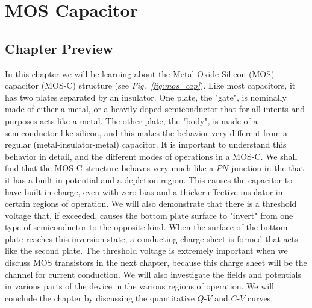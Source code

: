 \chapter{MOS Capacitor}
\label{ch:ch07_mos_c}
\graphicspath{{./figures/figs_ch07_MOS_C/}}
\section{Chapter Preview}
In this chapter we will be learning about the Metal-Oxide-Silicon (MOS) capacitor (MOS-C) structure (see \emph{Fig.~\ref{fig:mos_cap}}). Like most capacitors, it has two plates separated by an insulator.  One plate, the "gate", is nominally made of either a metal, or a heavily doped semiconductor that for all intents and purposes acts like a metal.  The other plate, the "body",  is made of a semiconductor like silicon, and this makes the behavior very different from a regular (metal-insulator-metal) capacitor. It is important to understand this behavior in detail, and the different modes of operations in a MOS-C.  We shall find that the MOS-C structure behaves very much like a $PN$-junction in the that it has a built-in potential and a depletion region.  This causes the capacitor to have built-in charge, even with zero bias and a thicker effective insulator in certain regions of operation.  We will also demonstrate that there is a threshold voltage that, if exceeded, causes the bottom plate surface to "invert" from one type of semiconductor to the opposite kind.  When the surface of the bottom plate reaches this inversion state, a conducting charge sheet is formed that acts like the second plate.  The threshold voltage is extremely important when we discuss MOS transistors in the next chapter, because this charge sheet will be the channel for current conduction.  We will also investigate the fields and potentials in various parts of the device in the various regions of operation.  We will conclude the chapter by discussing the quantitative $Q$-$V$ and $C$-$V$ curves.
